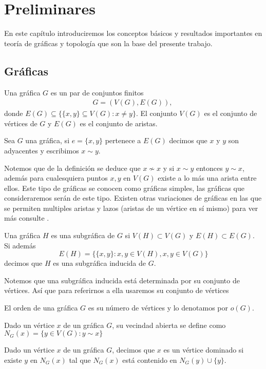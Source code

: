 \chapter{Preliminares}                %
En este capítulo introduciremos los conceptos básicos y resultados importantes en teoría de gráficas y topología que son la base del presente trabajo.
\section{Gráficas}
\begin{Defi}[Gráfica]
Una gráfica $G$ es un par de conjuntos finitos 
\begin{eqnarray*}
G=(V(G),E(G)),\
\end{eqnarray*}
donde $E(G)\subseteq \{\{x,y\}\subseteq V(G):x \neq y\}$. El conjunto $V(G)$ es el conjunto de vértices de $G$ y $E(G)$ es el conjunto de aristas.
\end{Defi}
\begin{Defi}
Sea $G$ una gráfica, si $e =\{x,y\}$ pertenece a $E(G)$ decimos que $x$ y $y$ son adyacentes y escribimos $x \sim y$.
\end{Defi}
 Notemos que de la definición se deduce que $x\nsim x$ y si $x\sim y$ entonces $y\sim x$, además para cualesquiera puntos $x,y$ en $V(G)$ existe a lo más una arista entre ellos. Este tipo de gráficas se conocen como gráficas simples, las gráficas que consideraremos serán de este tipo.  
Existen otras variaciones de gráficas en las que se permiten multiples aristas y lazos (aristas de un vértice en sí mismo) para ver más consulte \cite{Harary1969}. 

\begin{Defi}[Subgráfica]
Una gráfica $H$ es una subgráfica de $G$ si $V(H)\subset V(G)$ y $E(H)\subset E(G)$. Si además 
\begin{equation*}
E(H) = \{\{x,y\}\colon x,y \in V(H), {x,y}\in V(G)\}
\end{equation*}
decimos que $H$ es una subgráfica inducida de $G$.
\end{Defi}
Notemos que una subgráfica inducida está determinada por su conjunto de vértices. Así que para referirnos a ella usaremos su conjunto de vértices

\begin{Defi}
El orden de una gráfica $G$ es su número de vértices y lo denotamos por $o(G)$.
\end{Defi}
\begin{Defi}
Dado un vértice $x$ de un  gráfica $G$, su vecindad abierta se define como $N_{G}(x) = \{y\in V(G): y\sim x\}$ 
\end{Defi}
\begin{Defi}
Dado un vértice $x$ de un  gráfica $G$, decimos que $x$ es un vértice dominado si existe $y$ en $N_{G}(x)$ tal que $N_{G}(x)$ está contenido en $N_{G}(y)\cup\{y\}$.
\end{Defi}

